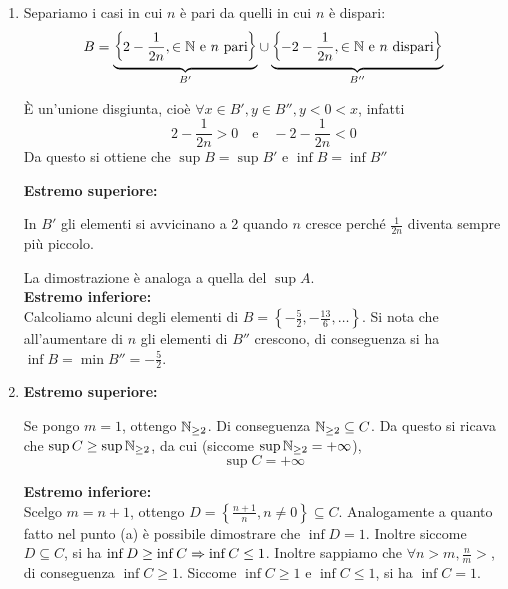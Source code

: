 \documentclass{article}
\begin{document}
\begin{enumerate}[label=\textbf{Esercizio 3.\arabic*.},itemindent=*]
\begin{enumerate}
\begin{itemize}
        \end{itemize}
        \item Separiamo i casi in cui $n$ è pari da quelli in cui $n$ è dispari:
        \[B=\underbrace{\left\{2-\frac{1}{2n}, \in \mathbb{N} \text{ e }n\text{ pari}\right\}}_{B'}\cup\underbrace{\left\{-2-\frac{1}{2n}, \in \mathbb{N} \text{ e }n\text{ dispari}\right\}}_{B''}\]
        \begin{oss}
            È un'unione disgiunta, cioè $\forall x \in B', y\in B'', y<0<x$, infatti 
                \[2-\frac{1}{2n}>0\text{~~ e ~~}-2-\frac{1}{2n}<0\]
            Da questo si ottiene che $\sup B=\sup B'$ e $\inf B=\inf B''$     
        \end{oss}
        \textbf{Estremo superiore:}
        \begin{oss}
            In $B'$ gli elementi si avvicinano a 2 quando $n$ cresce perché $\frac{1}{2n}$ diventa sempre più piccolo. 
        \end{oss}
        La dimostrazione è analoga a quella del $\sup A$.\\
        \textbf{Estremo inferiore:}\\
        Calcoliamo alcuni degli elementi di $B=\left\{-\frac{5}{2},-\frac{13}{6},\dots\right\}$. Si nota che all'aumentare di $n$ gli elementi di $B''$ crescono, di conseguenza si ha $\inf B=\min B''= -\frac{5}{2}$.
        \item \textbf{Estremo superiore:}
        \begin{oss}
            Se pongo $m=1$, ottengo $\mathbb{N}_{\geq2}$. Di conseguenza $\mathbb{N}_{\geq2}\subseteq C$. Da questo si ricava che $\sup C\geq \sup \mathbb{N}_{\geq 2}$, da cui (siccome $\sup \mathbb{N}_{\geq 2}=+\infty$), \[\sup C=+\infty\]
        \end{oss}
        \textbf{Estremo inferiore:}\\
        Scelgo $m=n+1$, ottengo $D=\left\{\frac{n+1}{n}, n\neq 0\right\}\subseteq C$. Analogamente a quanto fatto nel punto (a) è possibile dimostrare che $\inf D=1$. Inoltre siccome $D\subseteq C$, si ha $\inf D\geq \inf C\Rightarrow \inf C\leq 1$. Inoltre sappiamo che $\forall n> m, \frac{n}{m}>$, di conseguenza $\inf C\geq 1$. Siccome $\inf C\geq 1$ e $\inf C \leq 1$, si ha $\inf C=1$.
    \end{enumerate}
    

\end{enumerate}
\end{document}
